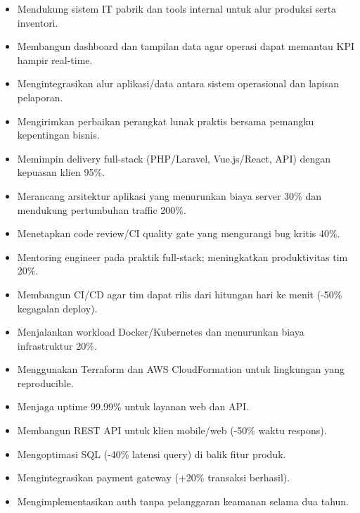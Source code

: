 
\begin{itemize}
\item Mendukung sistem IT pabrik dan tools internal untuk alur produksi serta inventori.
\item Membangun dashboard dan tampilan data agar operasi dapat memantau KPI hampir real-time.
\item Mengintegrasikan alur aplikasi/data antara sistem operasional dan lapisan pelaporan.
\item Mengirimkan perbaikan perangkat lunak praktis bersama pemangku kepentingan bisnis.
\end{itemize}
\divider

\begin{itemize}
\item Memimpin delivery full-stack (PHP/Laravel, Vue.js/React, API) dengan kepuasan klien 95\%.
\item Merancang arsitektur aplikasi yang menurunkan biaya server 30\% dan mendukung pertumbuhan traffic 200\%.
\item Menetapkan code review/CI quality gate yang mengurangi bug kritis 40\%.
\item Mentoring engineer pada praktik full-stack; meningkatkan produktivitas tim 20\%.
\end{itemize}
\divider

\begin{itemize}
\item Membangun CI/CD agar tim dapat rilis dari hitungan hari ke menit (-50\% kegagalan deploy).
\item Menjalankan workload Docker/Kubernetes dan menurunkan biaya infrastruktur 20\%.
\item Menggunakan Terraform dan AWS CloudFormation untuk lingkungan yang reproducible.
\item Menjaga uptime 99.99\% untuk layanan web dan API.
\end{itemize}
\divider

\begin{itemize}
\item Membangun REST API untuk klien mobile/web (-50\% waktu respons).
\item Mengoptimasi SQL (-40\% latensi query) di balik fitur produk.
\item Mengintegrasikan payment gateway (+20\% transaksi berhasil).
\item Mengimplementasikan auth tanpa pelanggaran keamanan selama dua tahun.
\end{itemize}
\divider

